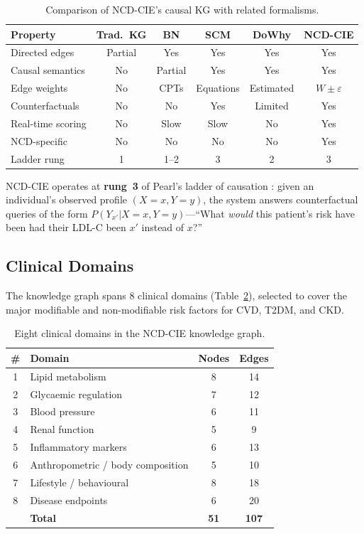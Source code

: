 \documentclass[runningheads]{llncs}
\begin{document}
\begin{table}[t]
\centering
\caption{Comparison of NCD-CIE's causal KG with related formalisms.}
\label{tab:comparison}
\small
\begin{tabular}{@{}lccccc@{}}
\toprule
\textbf{Property} & \textbf{Trad.\ KG} & \textbf{BN} & \textbf{SCM} & \textbf{DoWhy} & \textbf{NCD-CIE} \\
\midrule
Directed edges       & Partial & Yes & Yes & Yes & Yes \\
Causal semantics     & No      & Partial & Yes & Yes & Yes \\
Edge weights         & No      & CPTs & Equations & Estimated & $W \pm \varepsilon$ \\
Counterfactuals      & No      & No  & Yes & Limited & Yes \\
Real-time scoring    & No      & Slow & Slow & No & Yes \\
NCD-specific         & No      & No  & No  & No & Yes \\
Ladder rung          & 1       & 1--2 & 3   & 2  & 3 \\
\bottomrule
\end{tabular}
\end{table}

NCD-CIE operates at \textbf{rung~3} of Pearl's ladder of causation
\cite{pearl2018book}: given an individual's observed profile
$(X=x, Y=y)$, the system answers counterfactual queries of the form
$P(Y_{x'}|X=x, Y=y)$---``What \emph{would} this patient's risk have
been had their LDL-C been $x'$ instead of $x$?''

\subsection{Clinical Domains}

The knowledge graph spans 8 clinical domains (Table~\ref{tab:domains}),
selected to cover the major modifiable and non-modifiable risk factors
for CVD, T2DM, and CKD.

\begin{table}[t]
\centering
\caption{Eight clinical domains in the NCD-CIE knowledge graph.}
\label{tab:domains}
\small
\begin{tabular}{@{}clcc@{}}
\toprule
\textbf{\#} & \textbf{Domain} & \textbf{Nodes} & \textbf{Edges} \\
\midrule
1 & Lipid metabolism        & 8  & 14 \\
2 & Glycaemic regulation    & 7  & 12 \\
3 & Blood pressure          & 6  & 11 \\
4 & Renal function          & 5  & 9  \\
5 & Inflammatory markers    & 6  & 13 \\
6 & Anthropometric / body composition & 5 & 10 \\
7 & Lifestyle / behavioural & 8  & 18 \\
8 & Disease endpoints       & 6  & 20 \\
\midrule
  & \textbf{Total}          & \textbf{51} & \textbf{107} \\
\bottomrule
\end{tabular}
\end{table}
\end{document}
